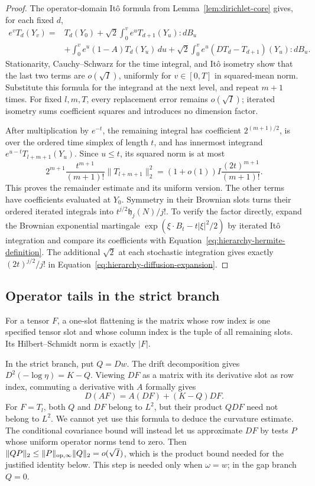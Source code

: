 \begin{proof}
The operator-domain It\^o formula from Lemma~\ref{lem:dirichlet-core}
gives, for each fixed $d$,
\begin{align*}
 e^vT_d(Y_v)
 ={}&T_d(Y_0)+\sqrt2\int_0^v e^uT_{d+1}(Y_u):dB_u\\
 &+\int_0^v e^u(1-A)T_d(Y_u)\,du
   +\sqrt2\int_0^v e^u(DT_d-T_{d+1})(Y_u):dB_u.
\end{align*}
Stationarity, Cauchy--Schwarz for the time integral, and It\^o isometry
show that the last two terms are $o(\sqrt I)$, uniformly for
$v\in[0,T]$ in squared-mean norm.  Substitute this formula for the
integrand at the next level, and repeat $m+1$ times.  For fixed $l,m,T$,
every replacement error remains $o(\sqrt I)$; iterated isometry sums
coefficient squares and introduces no dimension factor.

After multiplication by $e^{-t}$, the remaining integral has coefficient
$2^{(m+1)/2}$, is over the ordered time simplex of length $t$, and has
innermost integrand $e^{u-t}T_{l+m+1}(Y_u)$.  Since $u\le t$,
its squared norm is at most
\[
 2^{m+1}\frac{t^{m+1}}{(m+1)!}
       \|T_{l+m+1}\|_2^2
 =(1+o(1))I\frac{(2t)^{m+1}}{(m+1)!}.
\]
This proves the remainder estimate and its uniform version.
The other terms have coefficients evaluated at $Y_0$.  Symmetry in
their Brownian slots turns their ordered iterated integrals into
$t^{j/2}\mathfrak h_j(N)/j!$.  To verify the factor directly, expand
the Brownian exponential martingale
$\exp(\xi\cdot B_t-t|\xi|^2/2)$ by iterated It\^o integration and
compare its coefficients with
Equation~\eqref{eq:hierarchy-hermite-definition}.  The additional
$\sqrt2$ at each stochastic integration gives exactly
$(2t)^{j/2}/j!$ in
Equation~\eqref{eq:hierarchy-diffusion-expansion}.
\end{proof}

\subsection{Operator tails in the strict branch}

For a tensor $F$, a one-slot flattening is the matrix whose row index is
one specified tensor slot and whose column index is the tuple of all
remaining slots.  Its Hilbert--Schmidt norm is exactly $|F|$.

In the strict branch, put $Q=Dw$. The drift decomposition gives
$D^2(-\log\eta)=K-Q$. Viewing $DF$ as a matrix with its derivative
slot as row index, commuting a derivative with $A$ formally gives
\[
 D(AF)=A(DF)+(K-Q)DF.
\]
For $F=T_l$, both $Q$ and $DF$ belong to $L^2$, but their product
$QDF$ need not belong to $L^2$. We cannot yet use this formula to
deduce the curvature estimate. The conditional covariance bound will
instead let us approximate $DF$ by tests $P$ whose uniform operator
norms tend to zero. Then
$\|QP\|_2\le\|P\|_{\mathrm{op},\infty}\|Q\|_2=o(\sqrt I)$,
which is the product bound needed for the justified identity below.
This step is needed only when $\omega=w$; in the gap branch $Q=0$.

